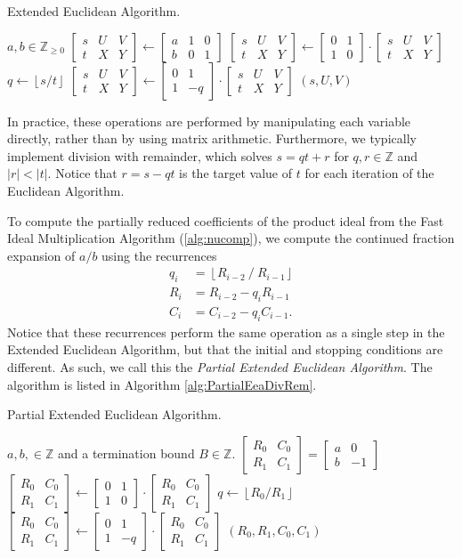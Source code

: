 \documentclass{ucalgthes1}
\theoremstyle{definition}
\newcommand{\ZZ}{\mathbb{Z}}
\newcommand{\ZZgez}{\mathbb{Z}_{\ge 0}}
\newcommand{\matrixtt}[4]{\left[ \begin{array}{rr} #1 & #2 \\ #3 & #4 \end{array} \right]}
\newcommand{\matrixThreeTwo}[6]{\left[ \begin{array}{rrr} #1 & #2 & #3 \\ #4 & #5 & #6 \end{array} \right]}
\newcommand{\floor}[1]{\left\lfloor #1 \right\rfloor}
\begin{document}
\begin{algorithm}[h]
\caption{Extended Euclidean Algorithm.}
\label{alg:EeaDivRem}
\begin{algorithmic}[1]
\REQUIRE $a,b \in \ZZgez$
\STATE $\matrixThreeTwo{s}{U}{V}{t}{X}{Y} \gets 
        \matrixThreeTwo{a}{1}{0}{b}{0}{1}$
	\STATE $\matrixThreeTwo{s}{U}{V}{t}{X}{Y} \gets
	        \matrixtt{0}{1}{1}{0} \cdot \matrixThreeTwo{s}{U}{V}{t}{X}{Y}$
\ENDIF
{}
	\STATE $q \gets \floor{s / t}$
	\STATE $\matrixThreeTwo{s}{U}{V}{t}{X}{Y} \gets \matrixtt{0}{1}{1}{-q} \cdot
		    \matrixThreeTwo{s}{U}{V}{t}{X}{Y}$ 
\ENDWHILE
\RETURN $(s, U, V)$ 
\end{algorithmic}
\end{algorithm}

In practice, these operations are performed by manipulating each variable directly, rather than by using matrix arithmetic.  Furthermore, we typically implement division with remainder, which solves $s = qt + r$ for $q,r \in \ZZ$ and $|r| < |t|$.  Notice that $r = s - qt$ is the target value of $t$ for each iteration of the Euclidean Algorithm.  

To compute the partially reduced coefficients of the product ideal from the Fast Ideal Multiplication Algorithm (\ref{alg:nucomp}), we compute the continued fraction expansion of $a/b$ using the recurrences
\begin{align*}
	q_i &= \floor{R_{i-2} ~/~ R_{i-1}} \\
	R_i &= R_{i-2} - q_i R_{i-1} \\
	C_i &= C_{i-2} - q_i C_{i-1}.
\end{align*}
Notice that these recurrences perform the same operation as a single step in the Extended Euclidean Algorithm, but that the initial and stopping conditions are different.  As such, we call this the \emph{Partial Extended Euclidean Algorithm}.    The algorithm is listed in Algorithm \ref{alg:PartialEeaDivRem}.

\begin{algorithm}[h]
\caption{Partial Extended Euclidean Algorithm.}
\label{alg:PartialEeaDivRem}
\begin{algorithmic}[1]
\REQUIRE $a,b, \in \ZZ$ and a termination bound $B \in \ZZ$.
\STATE $\matrixtt{R_0}{C_0}{R_1}{C_1} = \matrixtt{a}{0}{b}{-1}$
	\STATE $\matrixtt{R_0}{C_0}{R_1}{C_1} \gets
	        \matrixtt{0}{1}{1}{0} \cdot \matrixtt{R_0}{C_0}{R_1}{C_1}$
\ENDIF
{}
	\STATE $q \gets \floor{R_0 / R_1}$
	\STATE $\matrixtt{R_0}{C_0}{R_1}{C_1} \gets \matrixtt{0}{1}{1}{-q} \cdot
		    \matrixtt{R_0}{C_0}{R_1}{C_1}$ 
\ENDWHILE
\RETURN $(R_0, R_1, C_0, C_1)$
\end{algorithmic}
\end{algorithm}
\end{document}
